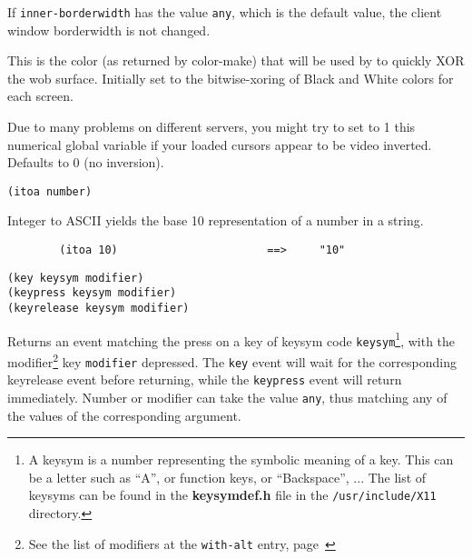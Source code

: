 If \verb"inner-borderwidth" has the value \verb"any", which is the default
value, the client window borderwidth is not changed.

        

This is the color (as returned by color-make) that will be used by 
 to quickly XOR the wob surface.
Initially set to the bitwise-xoring of Black and White colors for each
screen.

        

Due to many problems on different servers, you might try to set to 1 this
numerical global variable if your loaded cursors appear to be video
inverted. Defaults to 0 (no inversion).

        
{\usagefont\begin{verbatim}
(itoa number)
\end{verbatim}}\usageupspace

Integer to ASCII yields the base 10 representation of a number in a {\WOOL}
string.

{\exemplefont\begin{verbatim}
        (itoa 10)                       ==>     "10"
\end{verbatim}}

        
{\usagefont\begin{verbatim}
(key keysym modifier)
(keypress keysym modifier)
(keyrelease keysym modifier)
\end{verbatim}}\usageupspace

Returns an event matching the press on a key of keysym code
\verb"keysym"\footnote{A keysym is a number representing the symbolic
meaning of a key. This can be a letter such as ``A'', or function keys, or
``Backspace'', ... The list of keysyms can be found in the {\bf keysymdef.h}
file in the {\tt /usr/include/X11} directory.}, with the
modifier\footnote{See the list of modifiers at the \verb"with-alt" entry,
page~\pageref{with-alt}} key {\tt modifier} depressed. The \verb"key" event
will wait for the corresponding keyrelease event before returning, while the
\verb"keypress" event will return immediately. Number or modifier can take
the value \verb"any", thus matching any of the values of the corresponding
argument.

